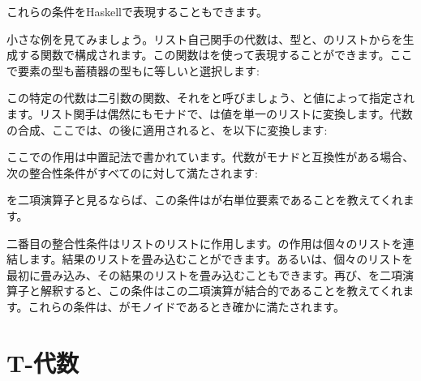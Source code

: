 \begin{figure}[H]
  \centering
  \begin{subfigure}
    \centering
  \end{subfigure}
  \hspace{1cm}
  \begin{subfigure}
    \centering
  \end{subfigure}
\end{figure}

\noindent
これらの条件をHaskellで表現することもできます。

小さな例を見てみましょう。リスト自己関手の代数は、型と、のリストからを生成する関数で構成されます。この関数はを使って表現することができます。ここで要素の型も蓄積器の型もに等しいと選択します: 

この特定の代数は二引数の関数、それをと呼びましょう、と値によって指定されます。リスト関手は偶然にもモナドで、は値を単一のリストに変換します。代数の合成、ここでは、の後に適用されると、を以下に変換します: 

ここでの作用は中置記法で書かれています。代数がモナドと互換性がある場合、次の整合性条件がすべてのに対して満たされます: 

を二項演算子と見るならば、この条件はが右単位要素であることを教えてくれます。

二番目の整合性条件はリストのリストに作用します。の作用は個々のリストを連結します。結果のリストを畳み込むことができます。あるいは、個々のリストを最初に畳み込み、その結果のリストを畳み込むこともできます。再び、を二項演算子と解釈すると、この条件はこの二項演算が結合的であることを教えてくれます。これらの条件は、がモノイドであるとき確かに満たされます。

\section{T-代数}

